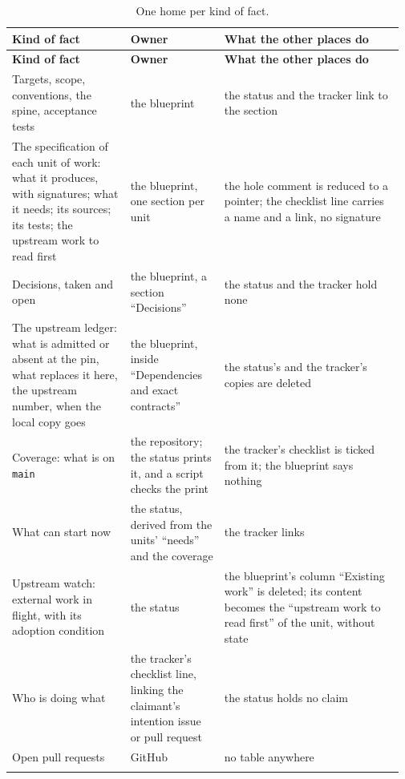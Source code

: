 {\footnotesize\setlength{\tabcolsep}{3pt}
\begin{longtable}{@{}>{\raggedright\arraybackslash}p{0.291\linewidth}>{\raggedright\arraybackslash}p{0.233\linewidth}>{\raggedright\arraybackslash}p{0.446\linewidth}@{}}
\caption{One home per kind of fact.}\label{tab:docs-owners}\\
\toprule
\textbf{Kind of fact} & \textbf{Owner} & \textbf{What the other places do} \\
\midrule
\endfirsthead
\toprule
\textbf{Kind of fact} & \textbf{Owner} & \textbf{What the other places do} \\
\midrule
\endhead
\bottomrule
\endfoot
Targets, scope, conventions, the spine, acceptance tests & the blueprint & the status and the tracker link to the section \\\addlinespace[2pt]
The specification of each unit of work: what it produces, with signatures; what it needs; its sources; its tests; the upstream work to read first & the blueprint, one section per unit & the hole comment is reduced to a pointer; the checklist line carries a name and a link, no signature \\\addlinespace[2pt]
Decisions, taken and open & the blueprint, a section ``Decisions'' & the status and the tracker hold none \\\addlinespace[2pt]
The upstream ledger: what is admitted or absent at the pin, what replaces it here, the upstream number, when the local copy goes & the blueprint, inside ``Dependencies and exact contracts'' & the status's and the tracker's copies are deleted \\\addlinespace[2pt]
Coverage: what is on \texttt{main} & the repository; the status prints it, and a script checks the print & the tracker's checklist is ticked from it; the blueprint says nothing \\\addlinespace[2pt]
What can start now & the status, derived from the units' ``needs'' and the coverage & the tracker links \\\addlinespace[2pt]
Upstream watch: external work in flight, with its adoption condition & the status & the blueprint's column ``Existing work'' is deleted; its content becomes the ``upstream work to read first'' of the unit, without state \\\addlinespace[2pt]
Who is doing what & the tracker's checklist line, linking the claimant's intention issue or pull request & the status holds no claim \\\addlinespace[2pt]
Open pull requests & GitHub & no table anywhere \\\addlinespace[2pt]

\end{longtable}}
